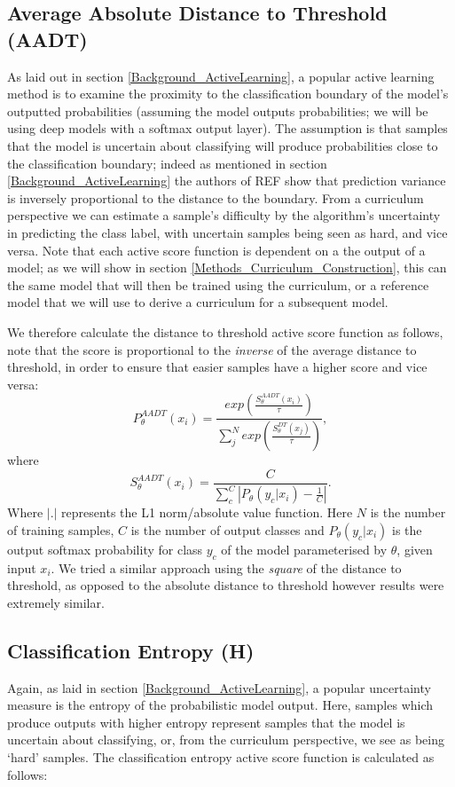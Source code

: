 \subsection{Average Absolute Distance to Threshold (AADT)}
As laid out in section \ref{Background_ActiveLearning}, a popular active learning method is to examine the proximity to the classification boundary of the model's outputted probabilities (assuming the model outputs probabilities; we will be using deep models with a softmax output layer). The assumption is that samples that the model is uncertain about classifying will produce probabilities close to the classification boundary; indeed as mentioned in section \ref{Background_ActiveLearning} the authors of REF show that prediction variance is inversely proportional to the distance to the boundary. From a curriculum perspective we can estimate a sample's difficulty by the algorithm's uncertainty in predicting the class label, with uncertain samples being seen as hard, and vice versa. Note that each active score function is dependent on a the output of a model; as we will show in section \ref{Methods_Curriculum_Construction}, this can the same model that will then be trained using the curriculum, or a reference model that we will use to derive a curriculum for a subsequent model.


We therefore calculate the distance to threshold active score function as follows, note that the score is proportional to the \textit{inverse} of the average distance to threshold, in order to ensure that easier samples have a higher score and vice versa:
\begin{equation}
P_{\theta}^{AADT} (x_i) = \frac{exp(\frac{S^{AADT}_{\theta}(x_i)}{\tau})}{\sum_{j}^{N} exp(\frac{S^{DT}_{\theta}(x_j)}{\tau})},
\end{equation}
where
\begin{equation}
S^{AADT}_{\theta}(x_i) = \frac{C}{ \sum_{c}^{C} \left|P_{\theta}(y_c |x_i) - \frac{1}{C}\right|}.
\end{equation}
Where $|.|$ represents the L1 norm/absolute value function.
Here $N$ is the number of training samples, $C$ is the number of output classes and $P_{\theta}(y_c |x_i)$ is the output softmax probability for class $y_c$ of the model parameterised by $\theta$, given input $x_i$. We tried a similar approach using the \textit{square} of the distance to threshold, as opposed to the absolute distance to threshold however results were extremely similar. 

\subsection{Classification Entropy (H)}
Again, as laid in section \ref{Background_ActiveLearning}, a popular uncertainty measure is the entropy of the probabilistic model output. Here, samples which produce outputs with higher entropy represent samples that the model is uncertain about classifying, or, from the curriculum perspective, we see as being `hard' samples. The classification entropy active score function is calculated as follows:

